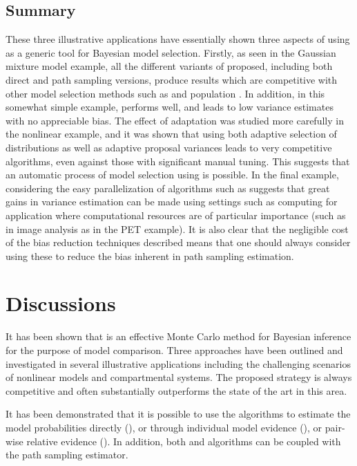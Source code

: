 \subsection{Summary}

These three illustrative applications have essentially shown three aspects of
using \smc as a generic tool for Bayesian model selection. Firstly, as seen in
the Gaussian mixture model example, all the different variants of \smc
proposed, including both direct and path sampling versions, produce results
which are competitive with other model selection methods such as \rjmcmc and
population \mcmc. In addition, in this somewhat simple example, \smc[2]
performs well, and leads to low variance estimates with no appreciable bias.
The effect of adaptation was studied more carefully in the nonlinear \ode
example, and it was shown that using both adaptive selection of distributions
as well as adaptive proposal variances leads to very competitive algorithms,
even against those with significant manual tuning. This suggests that an
automatic process of model selection using \smc[2] is possible. In the final
example, considering the easy parallelization of algorithms such as \smc[2]
suggests that great gains in variance estimation can be made using settings
such as \gpu computing for application where computational resources are of
particular importance (such as in image analysis as in the PET example). It is
also clear that the negligible cost of the bias reduction techniques described
means that one should always consider using these to reduce the bias inherent
in path sampling estimation.

\section{Discussions}
\label{sec:Bayesian SMC discussion}

It has been shown that \smc is an effective Monte Carlo method for Bayesian
inference for the purpose of model comparison. Three approaches have been
outlined and investigated in several illustrative applications including the
challenging scenarios of nonlinear \ode models and \pet compartmental systems.
The proposed strategy is always competitive and often substantially
outperforms the state of the art in this area.

It has been demonstrated that it is possible to use the \smc algorithms to
estimate the model probabilities directly (\smc[1]), or through individual
model evidence (\smc[2]), or pair-wise relative evidence (\smc[3]). In
addition, both \smc[2] and \smc[3] algorithms can be coupled with the path
sampling estimator.

